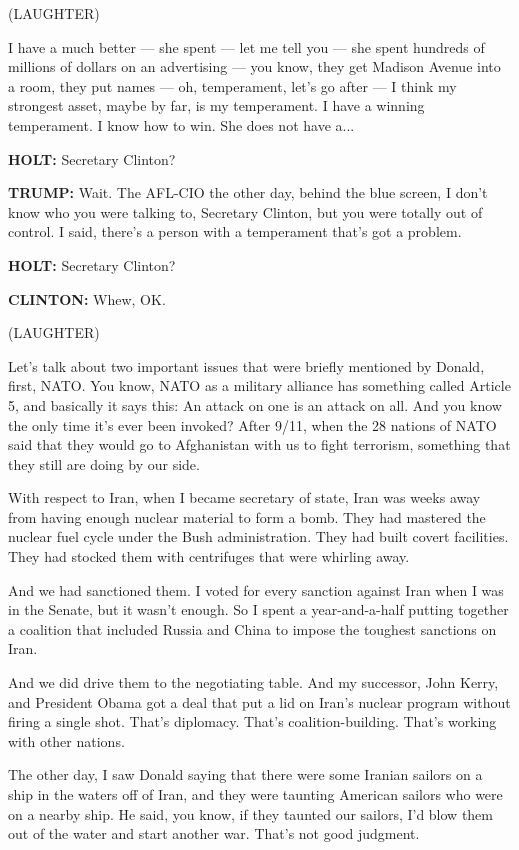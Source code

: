 (LAUGHTER)

I have a much better --- she spent --- let me tell you --- she spent
hundreds of millions of dollars on an advertising --- you know, they get
Madison Avenue into a room, they put names --- oh, temperament, let's go
after --- I think my strongest asset, maybe by far, is my temperament. I
have a winning temperament. I know how to win. She does not have a...

\textbf{HOLT:} Secretary Clinton?

\textbf{TRUMP:} Wait. The AFL-CIO the other day, behind the blue screen,
I don't know who you were talking to, Secretary Clinton, but you were
totally out of control. I said, there's a person with a temperament
that's got a problem.

\textbf{HOLT:} Secretary Clinton?

\textbf{CLINTON:} Whew, OK.

(LAUGHTER)

Let's talk about two important issues that were briefly mentioned by
Donald, first, NATO. You know, NATO as a military alliance has something
called Article 5, and basically it says this: An attack on one is an
attack on all. And you know the only time it's ever been invoked? After
9/11, when the 28 nations of NATO said that they would go to Afghanistan
with us to fight terrorism, something that they still are doing by our
side.

With respect to Iran, when I became secretary of state, Iran was weeks
away from having enough nuclear material to form a bomb. They had
mastered the nuclear fuel cycle under the Bush administration. They had
built covert facilities. They had stocked them with centrifuges that
were whirling away.

And we had sanctioned them. I voted for every sanction against Iran when
I was in the Senate, but it wasn't enough. So I spent a year-and-a-half
putting together a coalition that included Russia and China to impose
the toughest sanctions on Iran.

And we did drive them to the negotiating table. And my successor, John
Kerry, and President Obama got a deal that put a lid on Iran's nuclear
program without firing a single shot. That's diplomacy. That's
coalition-building. That's working with other nations.

The other day, I saw Donald saying that there were some Iranian sailors
on a ship in the waters off of Iran, and they were taunting American
sailors who were on a nearby ship. He said, you know, if they taunted
our sailors, I'd blow them out of the water and start another war.
That's not good judgment.

